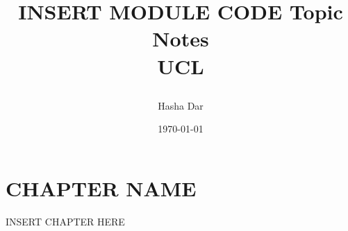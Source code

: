 \documentclass[12pt,a4paper, twoside]{report}
\begin{document}
\title{
  {INSERT MODULE CODE Topic Notes}\\
  {\large UCL}
  \author{Hasha Dar}
  \date{\today}
}
\maketitle
 
\tableofcontents
\chapter{CHAPTER NAME}
{INSERT CHAPTER HERE}
\end{document}
